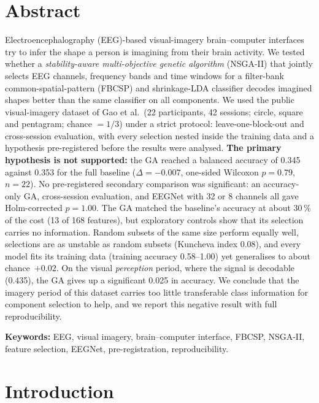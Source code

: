 \documentclass[11pt,a4paper]{article}
\begin{document}
\section*{Abstract}
Electroencephalography (EEG)-based visual-imagery brain--computer interfaces try to infer the
shape a person is imagining from their brain activity. We tested whether a \emph{stability-aware
multi-objective genetic algorithm} (NSGA-II) that jointly selects EEG channels, frequency bands and
time windows for a filter-bank common-spatial-pattern (FBCSP) and shrinkage-LDA classifier decodes
imagined shapes better than the same classifier on all components. We used the public visual-imagery
dataset of Gao et al.\ (22 participants, 42 sessions; circle, square and pentagram; chance $=1/3$)
under a strict protocol: leave-one-block-out and cross-session evaluation, with every selection nested
inside the training data and a hypothesis pre-registered before the results were analysed.
\textbf{The primary hypothesis is not supported:} the GA reached a balanced accuracy of 0.345 against
0.353 for the full baseline ($\Delta=-0.007$, one-sided Wilcoxon $p=0.79$, $n=22$). No pre-registered
secondary comparison was significant: an accuracy-only GA, cross-session evaluation, and EEGNet with 32
or 8 channels all gave Holm-corrected $p=1.00$. The GA matched the baseline's accuracy at about
30\,\% of the cost (13 of 168 features), but exploratory controls show that its selection carries no
information. Random subsets of the same size perform equally well, selections are as unstable as random
subsets (Kuncheva index 0.08), and every model fits its training data (training accuracy 0.58--1.00)
yet generalises to about chance~$+0.02$. On the visual \emph{perception} period, where the signal is
decodable (0.435), the GA gives up a significant 0.025 in accuracy. We conclude that the imagery period
of this dataset carries too little transferable class information for component selection to help, and
we report this negative result with full reproducibility.

\vspace{0.3cm}
\noindent\textbf{Keywords:} EEG, visual imagery, brain--computer interface, FBCSP, NSGA-II,
feature selection, EEGNet, pre-registration, reproducibility.

\clearpage
\tableofcontents
\clearpage

\section{Introduction}
\end{document}
